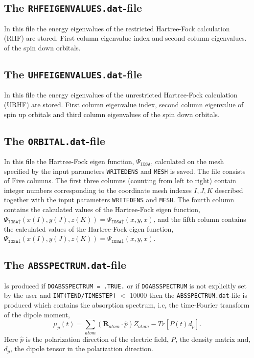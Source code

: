 \documentclass[a4paper,twoside,openany]{book}
\begin{document}
{{\subsection{The \texttt{RHFEIGENVALUES.dat}-file}
In this file the energy eigenvalues of the  restricted  Hartree-Fock  calculation (RHF) are stored. First column eigenvalue index and second column eigenvalues. 
of the spin down orbitals.

\subsection{The \texttt{UHFEIGENVALUES.dat}-file}
In this file the energy eigenvalues of the  unrestricted Hartree-Fock  calculation (URHF) are stored. First column eigenvalue index, second column eigenvalue of spin up orbitals and third column eigenvalues 
of the spin down orbitals.

\subsection{The \texttt{ORBITAL.dat}-file}
In this file the  Hartree-Fock eigen function, $\Psi_{\texttt{IOSA}}$, calculated on the mesh specified by  the input parameters \texttt{WRITEDENS} and \texttt{MESH} is saved. 
The file consists of Five columns. The first three columns (counting from left to right) 
contain integer numbers corresponding to the coordinate mesh indexes $I,J,K$ described together with the input parameters \texttt{WRITEDENS} and \texttt{MESH}. The fourth column 
contains the calculated values of the Hartree-Fock eigen function, $\Psi_{\texttt{IOSA}\uparrow}(x(I),y(J),z(K)) = \Psi_{\texttt{IOSA}\uparrow}(x,y,x)$, and the fifth column contains the 
calculated values of the Hartree-Fock eigen function, $\Psi_{\texttt{IOSA}\downarrow}(x(I),y(J),z(K)) = \Psi_{\texttt{IOSA}\downarrow}(x,y,x)$.

\subsection{The \texttt{ABSSPECTRUM.dat}-file}
Is produced if  \texttt{DOABSSPECTRUM = .TRUE.} or if \texttt{DOABSSPECTRUM} is not explicitly set by the user and \texttt{INT(TEND/TIMESTEP)} $<$ 10000 then the \texttt{ABSSPECTRUM.dat}-file is produced which contains the absorption spectrum, i.e, the time-Fourier transform of the dipole moment, 
\begin{equation}
\mu_{p}(t) = \sum_{atom}(\mathbf{R}_{atom}\cdot\hat{p})Z_{atom}-Tr[P(t)d_{p}].
\end{equation}
Here $\hat{p}$ is the polarization direction 
of the electric field, $P$, the density matrix and, $d_{p}$, the dipole tensor in the polarization direction.

}}
\end{document}
